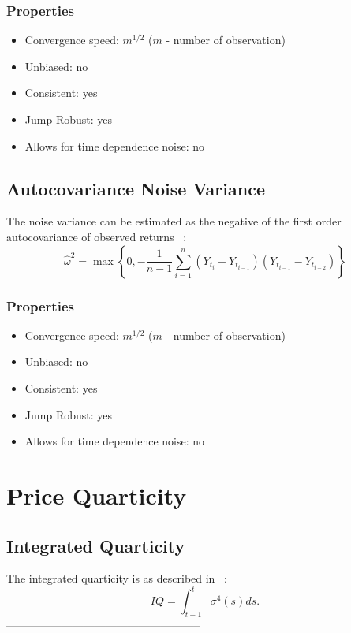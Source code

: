 \documentclass[letterpaper]{report}
\newcounter{N}
\begin{document}
\subsection{Properties}
\begin{itemize}
\item Convergence speed: $m^{1/2}$ ($m$ - number of observation)
\item Unbiased: no
\item Consistent: yes
\item Jump Robust: yes
\item Allows for time dependence noise: no
\end{itemize}
\section{Autocovariance Noise Variance}
The noise variance can be estimated as the negative of the first order autocovariance of observed returns ~\cite[Oomen, 2005]{Oomen}:
\begin{equation}
\label{AC_Variance}
\hat{\omega}^2=\max \left\{0, -\frac{1}{n-1}\sum_{i=1}^{n} (Y_{t_i} - Y_{t_{i-1}})(Y_{t_{i-1}} - Y_{t_{i-2}})\right\}
\end{equation}
\subsection{Properties}
\begin{itemize}
\item Convergence speed: $m^{1/2}$ ($m$ - number of observation)
\item Unbiased: no
\item Consistent: yes
\item Jump Robust: yes
\item Allows for time dependence noise: no
\end{itemize}


\chapter{Price Quarticity}

\section{Integrated Quarticity}
The integrated quarticity is as described in ~\cite[Pigorsch et al.]{Pigorsch_Pigorsch_Popov}:
\begin{equation}
IQ = \int_{t-1}^t \sigma^4(s)ds.
\end{equation}-----------------------------------------------------
\end{document}

